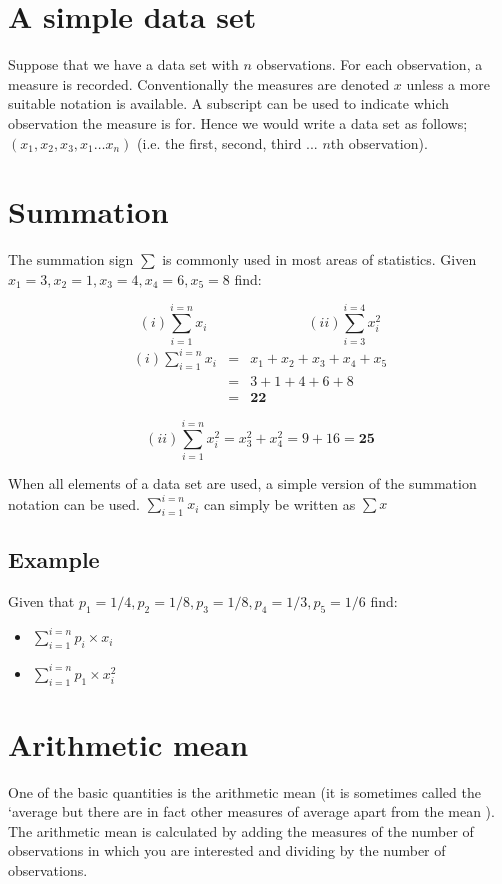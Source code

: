 \documentclass[12pt]{article}
\begin{document}
\section{A simple data set}Suppose that we have a data set with $n$ observations. For each observation, a measure is recorded. Conventionally the measures are denoted $x$ unless a more suitable notation is available. A subscript can be used to indicate which observation the measure is for.
Hence we would write a data set as follows; $(x_{1}, x_{2},x_{3} , x_{1} \dots x_{n})$ (i.e. the first, second, third ... $n$th observation).


\section{Summation}
The summation sign $\sum$ is commonly used in most areas of statistics.
Given $x_1 = 3, x_2= 1, x_3 = 4, x_4 = 6, x_5= 8 $ find:

\[
(i) \displaystyle\sum_{i=1}^{i=n} x_{i}  \hspace{3cm}
(ii) \displaystyle\sum_{i=3}^{i=4} x_{i}^2
\]
\begin{eqnarray*}(i) \displaystyle\sum_{i=1}^{i=n} x_{i} &=& x_1 + x_2 +  x_3 +  x_4 + x_5 \\  &=& 3 +1 +4 +6 + 8 \\ &=& \textbf{22} \end{eqnarray*}

\[ (ii) \displaystyle\sum_{i=1}^{i=n} x_{i}^2 = x_3^2 + x_4^2  = 9 + 16 = \textbf{25} \]

\noindent When all elements of a data set are used, a simple version of the summation notation can be used.
$\displaystyle\sum_{i=1}^{i=n} x_{i}$  can simply be written as $\sum x$


\subsection*{Example}
Given that $p_1= 1/4, p_2= 1/8, p_3= 1/8,p_4= 1/3, p_5 = 1/6$ find:

\begin{itemize}
\item $\displaystyle\sum_{i=1}^{i=n} p_{i} \times x_{i}$
\item $\displaystyle\sum_{i=1}^{i=n} p_{1} \times x_{i}^2$
\end{itemize}

\section{Arithmetic mean} One of the basic quantities is the arithmetic mean (it is sometimes
called the `average but there are in fact other measures of average apart from the
mean ). The arithmetic mean is calculated by
adding the measures of the number of observations in which you are interested and
dividing by the number of observations.
\end{document}
